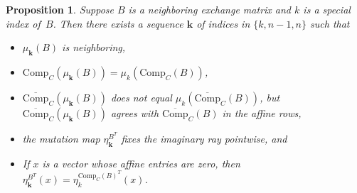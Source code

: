 \documentclass{amsart}
\newtheorem{proposition}{Proposition}[section]
\theoremstyle{definition}
\theoremstyle{remark}
\numberwithin{equation}{section}
\newcommand{\set}[1]{{\lbrace #1 \rbrace}}
\newcommand{\0}{{\mathbf{0}}}
\newcommand{\Comp}{\mathrm{Comp}_C}
\newcommand{\CompPlus}{\overline{\mathrm{Comp}}_C}
\newcommand{\kk}{{\boldsymbol{k}}}
\begin{document}
\begin{proposition}\label{special mut}
Suppose $B$ is a neighboring exchange matrix and $k$ is a special index of~$B$.
Then there exists a sequence $\kk$ of indices in $\set{k,n-1,n}$ such that 
\begin{itemize}
\item
$\mu_\kk(B)$ is neighboring,
\item
$\Comp(\mu_\kk(B))=\mu_k(\Comp(B))$,
\item
$\CompPlus(\mu_\kk(B))$ does not equal $\mu_k(\CompPlus(B))$, but $\CompPlus(\mu_\kk(B))$ agrees with $\CompPlus(B)$ in the affine rows,
\item
the mutation map $\eta^{B^T}_\kk$ fixes the imaginary ray pointwise, and 
\item
If $x$ is a vector whose affine entries are zero, then $\eta^{B^T}_\kk(x)=\eta^{\Comp(B)^T}_k(x)$.
\end{itemize}
\end{proposition}
\end{document}
